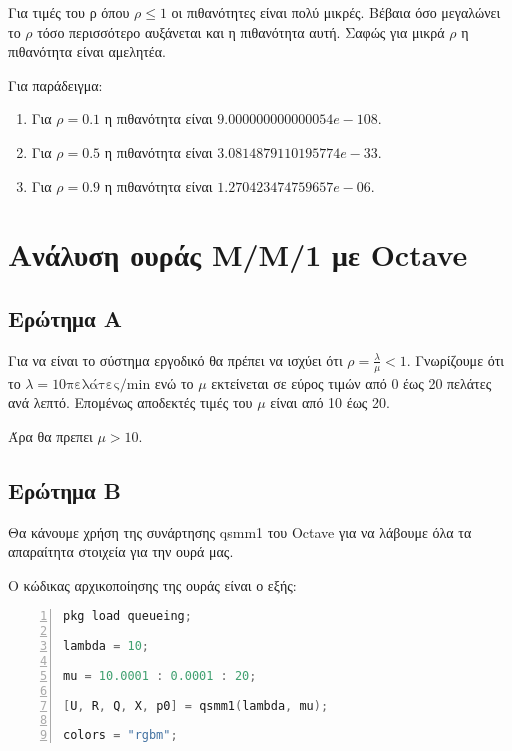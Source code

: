 \documentclass[12pt]{article}
\begin{document}
Για τιμές του ρ όπου $\rho \le 1$ οι πιθανότητες είναι πολύ μικρές. Βέβαια όσο μεγαλώνει το 
$\rho$ τόσο περισσότερο αυξάνεται και η πιθανότητα αυτή. Σαφώς για μικρά $\rho$ η πιθανότητα 
είναι αμελητέα.

Για παράδειγμα:
\begin{enumerate}
    \item{Για $\rho = 0.1$ η πιθανότητα είναι $9.000000000000054e-108$.}
    \item{Για $\rho = 0.5$ η πιθανότητα είναι $3.0814879110195774e-33$.}
    \item{Για $\rho = 0.9$ η πιθανότητα είναι $1.270423474759657e-06$.}
\end{enumerate}

\pagebreak

\section{Ανάλυση ουράς Μ/Μ/1 με Octave}

\subsection{Ερώτημα Α}

Για να είναι το σύστημα εργοδικό θα πρέπει να ισχύει ότι $\rho = \frac{\lambda}{\mu} < 1$.
Γνωρίζουμε ότι το $\lambda = 10 \text{πελάτες/min}$ ενώ το $\mu$ εκτείνεται σε εύρος τιμών 
από 0 έως 20 πελάτες ανά λεπτό. Επομένως αποδεκτές τιμές του $\mu$ είναι από 10 έως 20.

Άρα θα πρεπει $\mu > 10$.

\subsection{Ερώτημα Β}

Θα κάνουμε χρήση της συνάρτησης qsmm1 του Octave για να λάβουμε όλα τα απαραίτητα στοιχεία 
για την ουρά μας.

Ο κώδικας αρχικοποίησης της ουράς είναι ο εξής:

\begin{lstlisting}[language=C,
                   frame=single,
                   numberstyle=\color{codegray},
                   basicstyle=\footnotesize,
                   numbers=left,
                   backgroundcolor=\color{lightgray},
                   numbersep=5pt]
pkg load queueing;

lambda = 10;

mu = 10.0001 : 0.0001 : 20;

[U, R, Q, X, p0] = qsmm1(lambda, mu);

colors = "rgbm";
\end{lstlisting}
\end{document}
